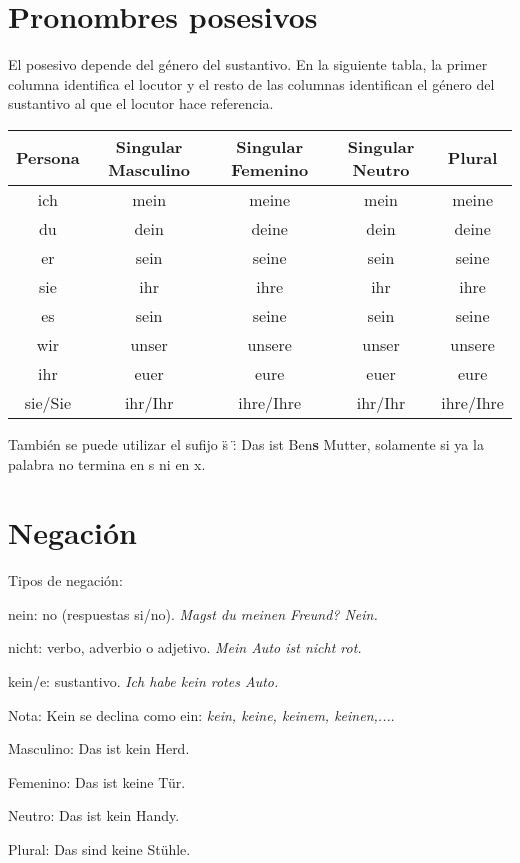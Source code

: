 \section{Pronombres posesivos}
El posesivo depende del género del sustantivo. En la siguiente tabla, la primer columna identifica el locutor y el resto de las columnas identifican el género del sustantivo al que el locutor hace referencia.
\begin{tabular}{|c | c c c c|}
\hline
\textbf{Persona} & \textbf{Singular Masculino} & \textbf{Singular Femenino} & \textbf{Singular Neutro} & \textbf{Plural}\\
\hline
ich & mein & meine & mein & meine \\
du & dein & deine & dein & deine \\
er & sein & seine & sein & seine \\
sie & ihr & ihre & ihr & ihre \\
es & sein & seine & sein & seine \\
wir & unser & unsere & unser & unsere \\
ihr & euer & eure & euer & eure \\
sie/Sie & ihr/Ihr &  ihre/Ihre & ihr/Ihr &  ihre/Ihre \\
\hline
\end{tabular}

También se puede utilizar el sufijo \" s \": Das ist Ben\textbf{s} Mutter, solamente si ya la palabra no termina en s ni en x.

\section{Negación}

Tipos de negación:
\begin{myitemize}
\item nein: no (respuestas si/no). \textit{Magst du meinen Freund? Nein.}
\item nicht: verbo, adverbio o adjetivo. \textit{Mein Auto ist nicht rot.}
\item kein/e: sustantivo. \textit{Ich habe kein rotes Auto.}
\end{myitemize}
Nota: Kein se declina como ein: \textit{kein, keine, keinem, keinen,...}.

\begin{myitemize}
\item Masculino: Das ist kein Herd.
\item Femenino: Das ist keine Tür.
\item Neutro: Das ist kein Handy.
\item Plural: Das sind keine Stühle.
\end{myitemize}


